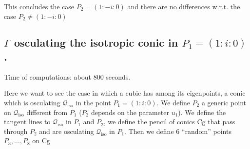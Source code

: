 \documentclass[11pt]{article}
\begin{document}
    This concludes the case \(P_2 =(1:-i:0)\) and there are no differences
w.r.t. the case \(P_2 \not= (1:-i:0)\)

    \hypertarget{gamma-osculating-the-isotropic-conic-in-p_11i0.}{%
\subsection{\texorpdfstring{\(\Gamma\) osculating the isotropic conic in
\(P_1=(1:i:0)\).}{\textbackslash Gamma osculating the isotropic conic in P\_1=(1:i:0).}}\label{gamma-osculating-the-isotropic-conic-in-p_11i0.}}

    Time of computations: about 800 seconds.

Here we want to see the case in which a cubic has among its eigenpoints,
a conic which is osculating \(\mathcal{Q}_{\mathrm{iso}}\) in the point
\(P_1=(1:i:0)\). We define \(P_2\) a generic point on
\(\mathcal{Q}_{\mathrm{iso}}\) different from \(P_1\) (\(P_2\) depends
on the parameter \(u_1\)). We define the tangent lines to
\(\mathcal{Q}_{\mathrm{iso}}\) in \(P_1\) and \(P_2\), we define the
pencil of conics Cg that pass through \(P_2\) and are osculating
\(\mathcal{Q}_{\mathrm{iso}}\) in \(P_1\). Then we define 6 ``random''
points \(P_3, \dots, P_8\) on Cg
\end{document}

